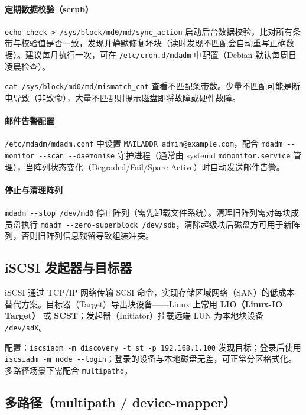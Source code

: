 \documentclass[12pt,UTF8]{ctexbook}
\begin{document}
\paragraph{定期数据校验（scrub）}

\verb|echo check > /sys/block/md0/md/sync_action| 启动后台数据校验，比对所有条带与校验值是否一致，发现并静默修复坏块（读时发现不匹配会自动重写正确数据）。建议每月执行一次，可在 \verb|/etc/cron.d/mdadm| 中配置（Debian 默认每周日凌晨检查）。

\verb|cat /sys/block/md0/md/mismatch_cnt| 查看不匹配条带数。少量不匹配可能是断电导致（非致命），大量不匹配则提示磁盘即将故障或硬件故障。

\paragraph{邮件告警配置}

\verb|/etc/mdadm/mdadm.conf| 中设置 \verb|MAILADDR admin@example.com|，配合 \verb|mdadm --monitor --scan --daemonise| 守护进程（通常由 systemd \verb|mdmonitor.service| 管理），当阵列状态变化（Degraded/Fail/Spare Active）时自动发送邮件告警。

\paragraph{停止与清理阵列}

\verb|mdadm --stop /dev/md0| 停止阵列（需先卸载文件系统）。清理旧阵列需对每块成员盘执行 \verb|mdadm --zero-superblock /dev/sdb|，清除超级块后磁盘方可用于新阵列，否则旧阵列信息残留导致组装冲突。

    \subsection{iSCSI 发起器与目标器}

iSCSI 通过 TCP/IP 网络传输 SCSI 命令，实现存储区域网络（SAN）的低成本替代方案。目标器（Target）导出块设备——Linux 上常用 \textbf{LIO（Linux-IO Target）} 或 \textbf{SCST}；发起器（Initiator）挂载远端 LUN 为本地块设备 \verb|/dev/sdX|。

配置：\verb|iscsiadm -m discovery -t st -p 192.168.1.100| 发现目标；登录后使用 \verb|iscsiadm -m node --login|；登录的设备与本地磁盘无差，可正常分区格式化。多路径场景下需配合 \verb|multipathd|。

    \subsection{多路径（multipath / device-mapper）}
\end{document}

